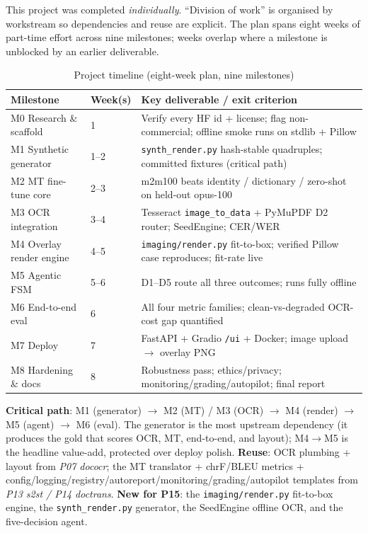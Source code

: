\documentclass[12pt,a4paper]{article}
\begin{document}
This project was completed \textit{individually}. ``Division of work'' is organised by workstream so dependencies and reuse are explicit. The plan spans eight weeks of part-time effort across nine milestones; weeks overlap where a milestone is unblocked by an earlier deliverable.

\begin{table}[H]
\centering
\caption{Project timeline (eight-week plan, nine milestones)}
\small
\begin{tabularx}{\linewidth}{@{} l l L @{}}
\toprule
\textbf{Milestone} & \textbf{Week(s)} & \textbf{Key deliverable / exit criterion} \\
\midrule
M0 Research \& scaffold & 1 & Verify every HF id + license; flag non-commercial; offline smoke runs on stdlib + Pillow \\
M1 Synthetic generator & 1--2 & \texttt{synth\_render.py} hash-stable quadruples; committed fixtures (critical path) \\
M2 MT fine-tune core & 2--3 & m2m100 beats identity / dictionary / zero-shot on held-out opus-100 \\
M3 OCR integration & 3--4 & Tesseract \texttt{image\_to\_data} + PyMuPDF D2 router; SeedEngine; CER/WER \\
M4 Overlay render engine & 4--5 & \texttt{imaging/render.py} fit-to-box; verified Pillow case reproduces; fit-rate live \\
M5 Agentic FSM & 5--6 & D1--D5 route all three outcomes; runs fully offline \\
M6 End-to-end eval & 6 & All four metric families; clean-vs-degraded OCR-cost gap quantified \\
M7 Deploy & 7 & FastAPI + Gradio \texttt{/ui} + Docker; image upload $\rightarrow$ overlay PNG \\
M8 Hardening \& docs & 8 & Robustness pass; ethics/privacy; monitoring/grading/autopilot; final report \\
\bottomrule
\end{tabularx}
\end{table}

\textbf{Critical path}: M1 (generator) $\rightarrow$ M2 (MT) / M3 (OCR) $\rightarrow$ M4 (render) $\rightarrow$ M5 (agent) $\rightarrow$ M6 (eval). The generator is the most upstream dependency (it produces the gold that scores OCR, MT, end-to-end, and layout); M4$\rightarrow$M5 is the headline value-add, protected over deploy polish. \textbf{Reuse}: OCR plumbing + layout from \emph{P07 dococr}; the MT translator + chrF/BLEU metrics + config/logging/registry/autoreport/monitoring/grading/autopilot templates from \emph{P13 s2st / P14 doctrans}. \textbf{New for P15}: the \texttt{imaging/render.py} fit-to-box engine, the \texttt{synth\_render.py} generator, the SeedEngine offline OCR, and the five-decision agent.
\end{document}
